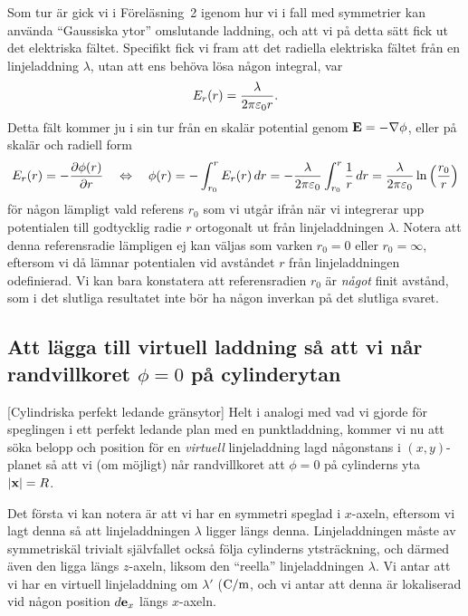 {{Som tur {\"a}r gick vi i F{\"o}rel{\"a}sning~2 igenom hur vi i fall med
symmetrier kan anv{\"a}nda ``Gaussiska ytor'' omslutande laddning, och att vi
p{\aa} detta s{\"a}tt fick ut det elektriska f{\"a}ltet. Specifikt fick vi fram
att det radiella elektriska f{\"a}ltet fr{\aa}n en linjeladdning $\lambda$,
utan att ens beh{\"o}va l{\"o}sa n{\aa}gon integral, var
$$
  E_r(r) = {{\lambda}\over{2\pi \varepsilon_0 r}}.
$$
Detta f{\"a}lt kommer ju i sin tur fr{\aa}n en skal{\"a}r potential genom
${\bf E}=-\nabla\phi$, eller p{\aa} skal{\"a}r och radiell form
$$
  E_r(r)=-{{\partial\phi(r)}\over{\partial r}}
    \quad\Leftrightarrow\quad
    \phi(r)=-\int^r_{r_0}E_r(r)\,dr
    =-{{\lambda}\over{2\pi \varepsilon_0}}\int^r_{r_0}{{1}\over{r}}\,dr
    ={{\lambda}\over{2\pi \varepsilon_0}}\ln\Big({{r_0}\over{r}}\Big)
$$
f{\"o}r n{\aa}gon l{\"a}mpligt vald referens $r_0$ som vi utg{\aa}r ifr{\aa}n
n{\"a}r vi integrerar upp potentialen till godtycklig radie $r$ ortogonalt ut
fr{\aa}n linjeladdningen $\lambda$. Notera att denna referensradie l{\"a}mpligen
ej kan v{\"a}ljas som varken $r_0=0$ eller $r_0=\infty$, eftersom vi d{\aa}
l{\"a}mnar potentialen vid avst{\aa}ndet $r$ fr{\aa}n linjeladdningen
odefinierad. Vi kan bara konstatera att referensradien $r_0$ {\"a}r
{\it n{\aa}got} finit avst{\aa}nd, som i det slutliga resultatet inte
b{\"o}r ha n{\aa}gon inverkan p{\aa} det slutliga svaret.

\subsection{Att l{\"a}gga till virtuell laddning s{\aa} att vi n{\aa}r
  randvillkoret $\phi=0$ p{\aa} cylinderytan}
[Cylindriska perfekt ledande gr{\"a}nsytor]
Helt i analogi med vad vi gjorde f{\"o}r speglingen i ett perfekt ledande plan
med en punktladdning, kommer vi nu att s{\"o}ka belopp och position f{\"o}r en
{\it virtuell} linjeladdning lagd n{\aa}gonstans i $(x,y)$-planet s{\aa} att vi
(om m{\"o}jligt) n{\aa}r randvillkoret att $\phi=0$ p{\aa} cylinderns yta
$|{\bf x}|=R$.

Det f{\"o}rsta vi kan notera {\"a}r att vi har en symmetri speglad i $x$-axeln,
eftersom vi lagt denna s{\aa} att linjeladdningen $\lambda$ ligger l{\"a}ngs
denna.
Linjeladdningen m{\aa}ste av symmetrisk{\"a}l trivialt sj{\"a}lvfallet ocks{\aa}
f{\"o}lja cylinderns ytstr{\"a}ckning, och d{\"a}rmed {\"a}ven den ligga
l{\"a}ngs $z$-axeln, liksom den ``reella'' linjeladdningen $\lambda$.
Vi antar att vi har en virtuell linjeladdning om $\lambda'$ (${\rm C}/{\rm m}$,
och vi antar att denna {\"a}r lokaliserad vid n{\aa}gon position $d{\bf e}_x$
l{\"a}ngs $x$-axeln.

}}
